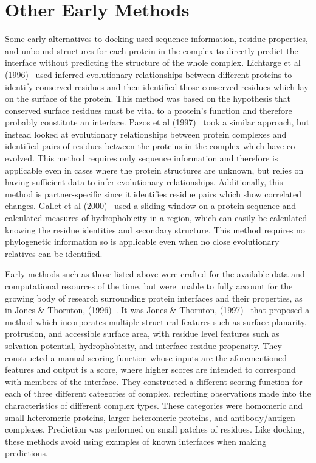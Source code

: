 \section{Other Early Methods}

Some early alternatives to docking used sequence information, residue properties, and unbound structures for each protein in the complex to directly predict the interface without predicting the structure of the whole complex.
Lichtarge et al (1996)~\cite{lichtarge1996} used inferred evolutionary relationships between different proteins to identify conserved residues and then identified those conserved residues which lay on the surface of the protein.
This method was based on the hypothesis that conserved surface residues must be vital to a protein's function and therefore probably constitute an interface.
Pazos et al (1997)~\cite{pazos1997} took a similar approach, but instead looked at evolutionary relationships between protein complexes and identified pairs of residues between the proteins in the complex which have co-evolved.
This method requires only sequence information and therefore is applicable even in cases where the protein structures are unknown, but relies on having sufficient data to infer evolutionary relationships.
Additionally, this method is partner-specific since it identifies residue pairs which show correlated changes.
Gallet et al (2000)~\cite{gallet2000} used a sliding window on a protein sequence and calculated measures of hydrophobicity in a region, which can easily be calculated knowing the residue identities and secondary structure.
This method requires no phylogenetic information so is applicable even when no close evolutionary relatives can be identified.

Early methods such as those listed above were crafted for the available data and computational resources of the time, but were unable to fully account for the growing body of research surrounding protein interfaces and their properties, as in Jones \& Thornton, (1996)~\cite{jones1996}.
It was Jones \& Thornton, (1997)~\cite{jones1997} that proposed a method which incorporates multiple structural features such as surface planarity, protrusion, and accessible surface area, with residue level features such as solvation potential, hydrophobicity, and interface residue propensity.
They constructed a manual scoring function whose inputs are the aforementioned features and output is a score, where higher scores are intended to correspond with members of the interface.
They constructed a different scoring function for each of three different categories of complex, reflecting observations made into the characteristics of different complex types.
These categories were homomeric and small heteromeric proteins, larger heteromeric proteins, and antibody/antigen complexes.
Prediction was performed on small patches of residues.
Like docking, these methods avoid using examples of known interfaces when making predictions.

